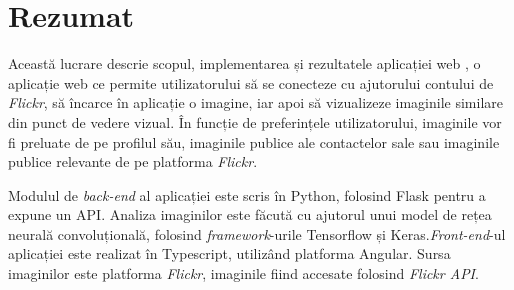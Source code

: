 \chapter*{Rezumat} 

Această lucrare descrie scopul, implementarea și rezultatele aplicației web {\applicationtitle}, o aplicație web ce permite utilizatorului să se conecteze cu ajutorului contului de \textit{Flickr}, să încarce în aplicație o imagine, iar apoi să vizualizeze imaginile similare din punct de vedere vizual. În funcție de preferințele utilizatorului, imaginile vor fi preluate de pe profilul său, imaginile publice ale contactelor sale sau imaginile publice relevante de pe platforma \textit{Flickr}.

Modulul de \textit{back-end} al aplicației este scris în Python, folosind Flask pentru a expune un API.
Analiza imaginilor este făcută cu ajutorul unui model de rețea neurală convoluțională, folosind \textit{framework}-urile Tensorflow și Keras.\textit{Front-end}-ul aplicației este realizat în Typescript, utilizând platforma Angular. Sursa imaginilor este platforma \textit{Flickr}, imaginile fiind accesate folosind \textit{Flickr API}.
